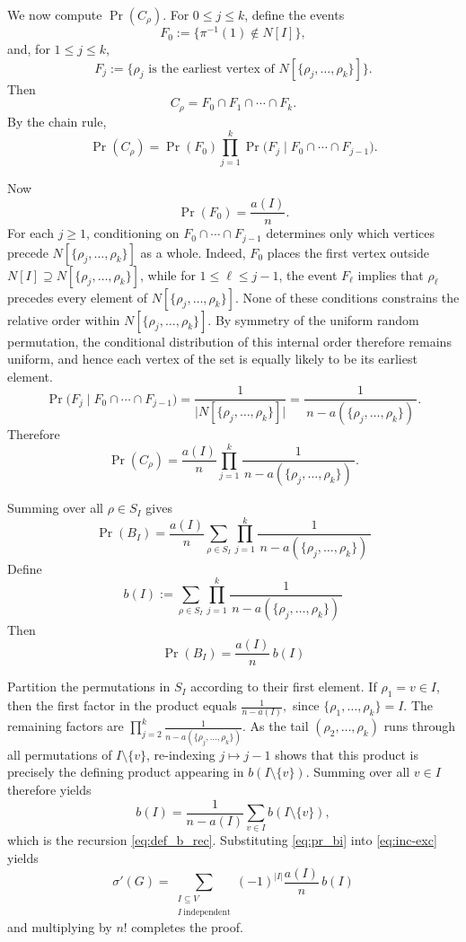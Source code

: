 \documentclass[11pt,a4paper]{article}
\numberwithin{equation}{section}
\theoremstyle{plain}
\theoremstyle{definition}
\theoremstyle{remark}
\begin{document}
We now compute \(\Pr(C_\rho)\). For \(0\le j\le k\), define the events
\[
F_0 := \{\pi^{-1}(1)\notin N[I]\},
\]
and, for \(1\le j\le k\),
\[
F_j := \bigl\{\rho_j \text{ is the earliest vertex of } N[\{\rho_j,\dots,\rho_k\}]\bigr\}.
\]
Then
\[
C_\rho = F_0\cap F_1\cap\cdots\cap F_k.
\]
By the chain rule,
\[
\Pr(C_\rho)
=
\Pr(F_0)\prod_{j=1}^k
\Pr\!\bigl(F_j \mid F_0\cap\cdots\cap F_{j-1}\bigr).
\]

Now
\[
\Pr(F_0)=\frac{a(I)}{n}.
\]
For each \(j\ge1\), conditioning on
\(F_0\cap\cdots\cap F_{j-1}\) determines only which vertices precede
\(N[\{\rho_j,\dots,\rho_k\}]\) as a whole. Indeed, \(F_0\) places the
first vertex outside \(N[I]\supseteq N[\{\rho_j,\dots,\rho_k\}]\), while
for \(1\le \ell\le j-1\), the event \(F_\ell\) implies that
\(\rho_\ell\) precedes every element of
\(N[\{\rho_j,\dots,\rho_k\}]\). None of these conditions constrains the
relative order within \(N[\{\rho_j,\dots,\rho_k\}]\). By symmetry of the
uniform random permutation, the conditional distribution of this
internal order therefore remains uniform, and hence each vertex of the
set is equally likely to be its earliest element.
\[
\Pr\!\bigl(F_j \mid F_0\cap\cdots\cap F_{j-1}\bigr)
=
\frac{1}{\bigl|N[\{\rho_j,\dots,\rho_k\}]\bigr|}
=
\frac{1}{\,n-a(\{\rho_j,\dots,\rho_k\})\,}.
\]
Therefore
\[
\Pr(C_\rho)
=
\frac{a(I)}{n}
\prod_{j=1}^k
\frac{1}{\,n-a(\{\rho_j,\dots,\rho_k\})\,}.
\]

Summing over all \(\rho\in S_I\) gives
\[
\Pr(B_I)
=
\frac{a(I)}{n}
\sum_{\rho\in S_I}
\prod_{j=1}^{k}
\frac{1}{\,n-a(\{\rho_j,\dots,\rho_k\})\,}
\]
Define
\begin{equation}
\label{eq:def_b_sum}
    b(I)
    :=
    \sum_{\rho\in S_I}
    \prod_{j=1}^{k}
    \frac{1}{\,n-a(\{\rho_j,\dots,\rho_k\})\,}
\end{equation}
Then
\begin{equation}
\label{eq:pr_bi}
\Pr(B_I)=\frac{a(I)}{n}\,b(I)
\end{equation}

Partition the permutations in \(S_I\) according to their first element.
If \(\rho_1=v\in I\), then the first factor in the product equals
$\frac{1}{n-a(I)},$
since \(\{\rho_1,\dots,\rho_k\}=I\).
The remaining factors are
\(
\prod_{j=2}^{k}
\frac{1}{n-a(\{\rho_j,\dots,\rho_k\})}.
\)
As the tail \((\rho_2,\dots,\rho_k)\) runs through all permutations of
\(I\setminus\{v\}\), re-indexing \(j\mapsto j-1\) shows that this product is precisely the defining product appearing in \(b(I\setminus\{v\})\).
Summing over all \(v\in I\) therefore yields
\[
b(I)
=
\frac{1}{n-a(I)}
\sum_{v\in I}
b(I\setminus\{v\}),
\]
which is the recursion \eqref{eq:def_b_rec}.
Substituting \eqref{eq:pr_bi} into \eqref{eq:inc-exc} yields
\[
\sigma'(G)
=
\sum_{\substack{I\subseteq V\\ I\ \mathrm{independent}}}
(-1)^{|I|}
\frac{a(I)}{n}\,b(I)
\]
and multiplying by \(n!\) completes the proof.
\end{document}
